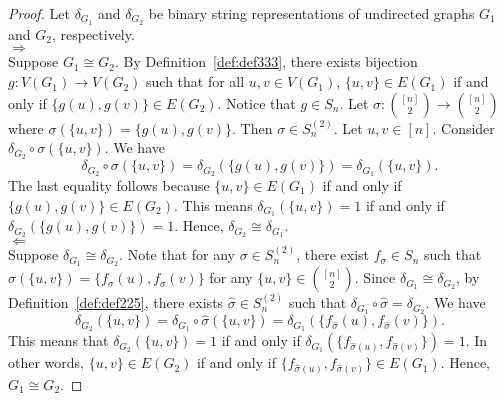 \begin{proof}
Let $\delta_{G_1}$ and $\delta_{G_2}$ be binary string representations of undirected graphs $G_1$ and $G_2$, respectively. \\
$\Rightarrow$\\
Suppose $G_1\cong G_2$. By Definition~\ref{def:def333}, there exists bijection $g:V(G_1)\rightarrow V(G_2)$ such that for all $u,v\in V(G_1)$, $\{u,v\}\in E(G_1)$ if and only if $\{g(u),g(v)\}\in E(G_2)$. Notice that $g\in S_n$. Let $\sigma:{[n]\choose 2}\rightarrow {[n]\choose 2}$ where $\sigma(\{u,v\})=\{g(u),g(v)\}$. Then $\sigma\in S_n^{(2)}$. Let $u,v\in [n]$. Consider $\delta_{G_2}\circ\sigma(\{u,v\})$. We have
\[\delta_{G_2}\circ\sigma(\{u,v\})=\delta_{G_2}(\{g(u),g(v)\})=\delta_{G_1}(\{u,v\}).\] The last equality follows because $\{u,v\}\in E(G_1)$ if and only if $\{g(u),g(v)\}\in E(G_2)$. This means  $\delta_{G_1}(\{u,v\})=1$ if and only if $\delta_{G_2}(\{g(u),g(v)\})=1$. Hence, $\delta_{G_2}\cong \delta_{G_1}$.\\
$\Leftarrow$\\
Suppose $\delta_{G_1}\cong \delta_{G_2}$. Note that for any $\sigma\in S_n^{(2)}$, there exist $f_\sigma\in S_n$ such that $\sigma(\{u,v\})=\{f_\sigma(u),f_\sigma(v)\}$ for any $\{u,v\}\in{[n]\choose2}$. Since $\delta_{G_1}\cong\delta_{G_2}$, by Definition~\ref{def:def225}, there exists $\hat\sigma\in S_n^{(2)}$ such that $\delta_{G_1}\circ \hat\sigma=\delta_{G_2}$. We have
\[\delta_{G_2}(\{u,v\})=\delta_{G_1}\circ \hat\sigma(\{u,v\})=\delta_{G_1}(\{f_{\hat\sigma}(u),f_{\hat\sigma}(v)\}).\]
This means that $\delta_{G_2}(\{u,v\})=1$ if and only if $\delta_{G_1}(\{f_{\hat\sigma(u)},f_{\hat\sigma(v)}\})=1$. In other words, $\{u,v\}\in E(G_2)$ if and only if $\{f_{\hat\sigma(u)},f_{\hat\sigma(v)}\}\in E(G_1)$. Hence, $G_1\cong G_2$. 
\end{proof}


